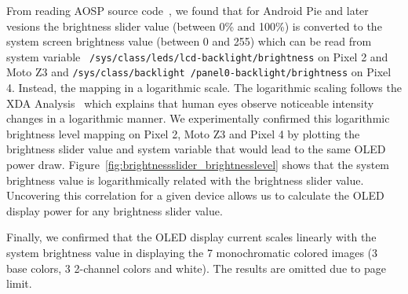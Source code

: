 From reading AOSP source code~\cite{sourcecode:brightness1,sourcecode:brightness2},
we found that for Android Pie and later vesions %
the brightness slider value (between 0\% and 100\%) is 
converted to the system screen brightness value (between 0 and 255)
which can be read from system variable {\small \tt
  /sys/class/leds/lcd-backlight/brightness} on Pixel 2 and Moto Z3
and {{\small \tt /sys/class/backlight
    /panel0-backlight/brightness} on Pixel 4}.  Instead, the mapping
in a logarithmic scale.  The logarithmic scaling follows the XDA
Analysis~\cite{brightness2019} which explains that human eyes observe
noticeable intensity changes in a logarithmic manner.
%
We experimentally confirmed this logarithmic brightness level mapping on Pixel 2,
Moto Z3 and Pixel 4 by plotting the brightness slider value and 
system variable that would lead to the same OLED power draw.
Figure~\ref{fig:brightnessslider_brightnesslevel} shows that
the system brightness value is logarithmically related
with the brightness slider value.
%
Uncovering this correlation for a given device allows us to calculate
the OLED display power for any brightness slider value.

Finally, we confirmed that
the OLED display current scales linearly with
the system brightness value
in displaying
the 7 monochromatic colored images (3 base colors, 3 2-channel colors and white).
The results are omitted due to page limit.

